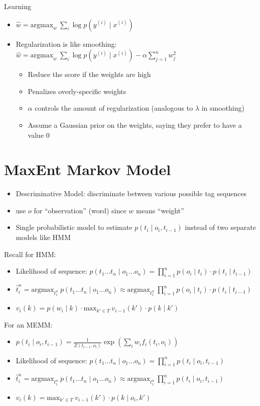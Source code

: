 \documentclass[11pt,letterpaper]{article}
\begin{document}
Learning

\begin{itemize}
  \item $\hat{w} = \text{argmax}_w~\sum_i \log p(y^{(i)} \mid x^{(i)})$
  \item Regularization is like smoothing: 
            $\hat{w} = \text{argmax}_w~\sum_i \log p(y^{(i)} \mid x^{(i)}) - \alpha \sum_{j=1}^n w_j^2$
    \begin{itemize}
      \item Reduce the score if the weights are high
      \item Penalizes overly-specific weights
      \item $\alpha$ controls the amount of regularization (analogous to $\lambda$ in smoothing)
      \item Assume a Gaussian prior on the weights, saying they prefer to have a value 0
    \end{itemize}
\end{itemize}


\section{MaxEnt Markov Model}

\begin{itemize}
  \item Descriminative Model: discriminate between various possible tag sequences
  \item use $o$ for ``observation'' (word) since $w$ means ``weight''
  \item Single probabilistic model to estimate $p(t_i \mid o_i, t_{i-1})$ instead of two separate models like HMM
\end{itemize}

Recall for HMM:

\begin{itemize}
  \item Likelihood of sequence: $p(t_1 ... t_n \mid o_1 ... o_n) = \prod_{i=1}^n p(o_i \mid t_i) \cdot p(t_i \mid t_{i-1})$
  \item $\hat{t}_i^n = \text{argmax}_{t_1^n}~p(t_1 ... t_n \mid o_1 ... o_n) \approx \text{argmax}_{t_1^n}~\prod_{i=1}^n p(o_i \mid t_i) \cdot p(t_i \mid t_{i-1})$
  \item $v_i(k) = p(w_i \mid k) \cdot \text{max}_{k' \in T}~v_{i-1}(k') \cdot p(k \mid k')$
\end{itemize}

For an MEMM:
\begin{itemize}
  \item $p(t_i \mid o_i, t_{i-1}) = \frac{1}{Z(t_{i-1},o_i)} \exp \left( \sum_i w_i f_i(t_i,o_i) \right)$
  \item Likelihood of sequence: $p(t_1 ... t_n \mid o_1 ... o_n) = \prod_{i=1}^n p(t_i \mid o_i, t_{i-1})$
  \item $\hat{t}_i^n = \text{argmax}_{t_1^n}~p(t_1 ... t_n \mid o_1 ... o_n) \approx \text{argmax}_{t_1^n}~\prod_{i=1}^n p(t_i \mid o_i, t_{i-1})$
  \item $v_i(k) = \text{max}_{k' \in T}~v_{i-1}(k') \cdot p(k \mid o_i, k')$
\end{itemize}
\end{document}

